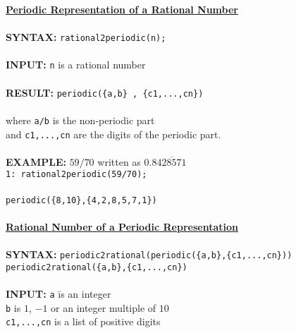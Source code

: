 \begin{tabbing}
{\bf \underline{Periodic Representation of a Rational Number}}\\ \\


{\bf SYNTAX:} \hspace{3mm} 
     \= {\tt rational2periodic(n);}\\ \\

{\bf INPUT:}  
     \> {\tt n} \hspace{3mm} is a rational number\\ \\

{\bf RESULT:}
     \> {\tt periodic(\{a,b\} , \{c1,...,cn\})} \\ \\
     \> where  {\tt a/b} is the non-periodic part\\
     \> and {\tt c1,...,cn} are the digits of the periodic part.\\ \\


{\bf EXAMPLE:}
    \> $59/70$ written as $0.8\overline{428571}$\\
    \>  {\tt 1: rational2periodic(59/70);}\\ \\
    \> {\tt periodic(\{8,10\},\{4,2,8,5,7,1\})}\\ \\


{\bf \underline{Rational Number of a Periodic Representation}}\\ \\


{\bf SYNTAX:}
     \> {\tt periodic2rational(periodic(\{a,b\},\{c1,...,cn\}))}\\
     \> {\tt periodic2rational(\{a,b\},\{c1,...,cn\})}\\ \\


{\bf INPUT:}
     \> \hspace{15mm} {\tt a} \hspace{3mm}\= is an integer\\
     \> \hspace{15mm} {\tt b}             \> is $1$, $-1$ or an 
                                             integer multiple of $10$\\
     \> {\tt c1,...,cn}               \> is a list of positive digits\\ \\


\end{tabbing}
